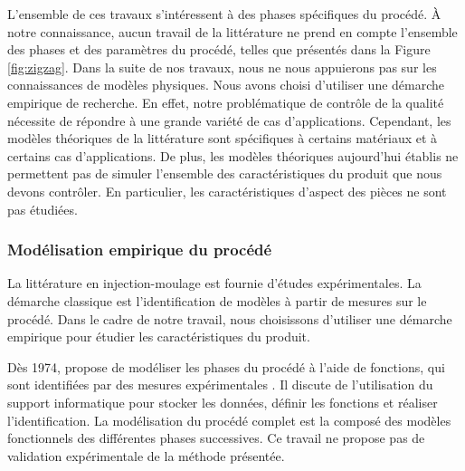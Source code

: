 L'ensemble de ces travaux s'intéressent à des phases spécifiques du procédé.
À notre connaissance, aucun travail de la littérature ne prend en compte l'ensemble des phases et des paramètres du procédé, telles que présentés dans la Figure \ref{fig:zigzag}.
Dans la suite de nos travaux, nous ne nous appuierons pas sur les connaissances de modèles physiques.
Nous avons choisi d'utiliser une démarche empirique de recherche.
En effet, notre problématique de contrôle de la qualité nécessite de répondre à une grande variété de cas d'applications.
Cependant, les modèles théoriques de la littérature sont spécifiques à certains matériaux et à certains cas d'applications.
De plus, les modèles théoriques aujourd'hui établis ne permettent pas de simuler l'ensemble des caractéristiques du produit que nous devons contrôler.
En particulier, les caractéristiques d'aspect des pièces ne sont pas étudiées.

\subsubsection{Modélisation empirique du procédé}
La littérature en injection-moulage est fournie d'études expérimentales.
La démarche classique est l'identification de modèles à partir de mesures sur le procédé.
Dans le cadre de notre travail, nous choisissons d'utiliser une démarche empirique pour étudier les caractéristiques du produit.

Dès 1974, \citeauthor{ma_design_1974} propose de modéliser les phases du procédé à l'aide de fonctions, qui sont identifiées par des mesures expérimentales \cite{ma_design_1974}.
Il discute de l'utilisation du support informatique pour stocker les données, définir les fonctions et réaliser l'identification.
La modélisation du procédé complet est la composé des modèles fonctionnels des différentes phases successives.
Ce travail ne propose pas de validation expérimentale de la méthode présentée.

